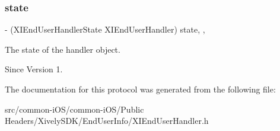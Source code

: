 \subsubsection{\texorpdfstring{state}{state}}
{\footnotesize\ttfamily -\/ (X\+I\+End\+User\+Handler\+State X\+I\+End\+User\+Handler) state\hspace{0.3cm}{\ttfamily [read]}, {\ttfamily [nonatomic]}, {\ttfamily [assign]}}



The state of the handler object. 

\begin{DoxySince}{Since}
Version 1. 
\end{DoxySince}


The documentation for this protocol was generated from the following file\+:\begin{DoxyCompactItemize}
\item 
src/common-\/i\+O\+S/common-\/i\+O\+S/\+Public Headers/\+Xively\+S\+D\+K/\+End\+User\+Info/X\+I\+End\+User\+Handler.\+h\end{DoxyCompactItemize}
